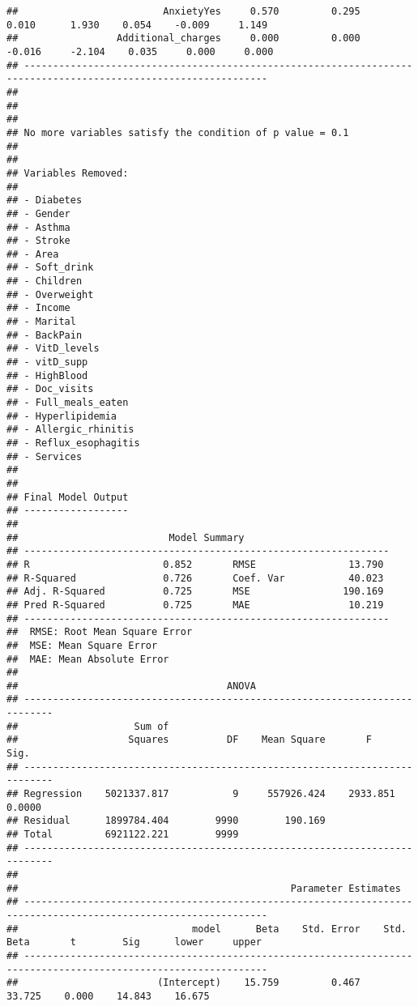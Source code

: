 \documentclass[
]{article}
\begin{document}
\begin{verbatim}
##                         AnxietyYes     0.570         0.295        0.010      1.930    0.054    -0.009     1.149 
##                 Additional_charges     0.000         0.000       -0.016     -2.104    0.035     0.000     0.000 
## ----------------------------------------------------------------------------------------------------------------
## 
## 
## 
## No more variables satisfy the condition of p value = 0.1
## 
## 
## Variables Removed: 
## 
## - Diabetes 
## - Gender 
## - Asthma 
## - Stroke 
## - Area 
## - Soft_drink 
## - Children 
## - Overweight 
## - Income 
## - Marital 
## - BackPain 
## - VitD_levels 
## - vitD_supp 
## - HighBlood 
## - Doc_visits 
## - Full_meals_eaten 
## - Hyperlipidemia 
## - Allergic_rhinitis 
## - Reflux_esophagitis 
## - Services 
## 
## 
## Final Model Output 
## ------------------
## 
##                          Model Summary                          
## ---------------------------------------------------------------
## R                       0.852       RMSE                13.790 
## R-Squared               0.726       Coef. Var           40.023 
## Adj. R-Squared          0.725       MSE                190.169 
## Pred R-Squared          0.725       MAE                 10.219 
## ---------------------------------------------------------------
##  RMSE: Root Mean Square Error 
##  MSE: Mean Square Error 
##  MAE: Mean Absolute Error 
## 
##                                    ANOVA                                    
## ---------------------------------------------------------------------------
##                    Sum of                                                  
##                   Squares          DF    Mean Square       F          Sig. 
## ---------------------------------------------------------------------------
## Regression    5021337.817           9     557926.424    2933.851    0.0000 
## Residual      1899784.404        9990        190.169                       
## Total         6921122.221        9999                                      
## ---------------------------------------------------------------------------
## 
##                                               Parameter Estimates                                                
## ----------------------------------------------------------------------------------------------------------------
##                              model      Beta    Std. Error    Std. Beta       t        Sig      lower     upper 
## ----------------------------------------------------------------------------------------------------------------
##                        (Intercept)    15.759         0.467                  33.725    0.000    14.843    16.675 

\end{verbatim}
\end{document}
